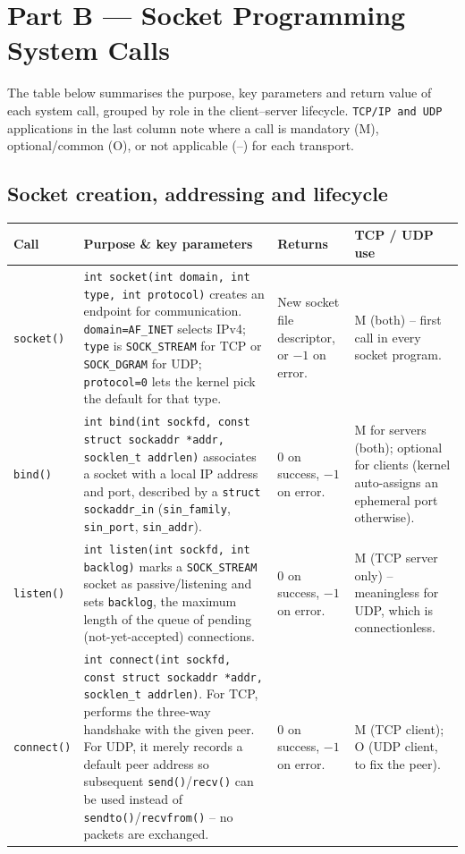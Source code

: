\documentclass[11pt,a4paper]{article}
\begin{document}
\clearpage
\section{Part B --- Socket Programming System Calls}

The table below summarises the purpose, key parameters and return value of each system
call, grouped by role in the client--server lifecycle. \texttt{TCP/IP and UDP} applications
in the last column note where a call is mandatory (M), optional/common (O), or not
applicable (--) for each transport.

\subsection{Socket creation, addressing and lifecycle}

\begin{longtable}{|p{2.6cm}|p{6.6cm}|p{2cm}|p{3.6cm}|}
\hline
\textbf{Call} & \textbf{Purpose \& key parameters} & \textbf{Returns} & \textbf{TCP / UDP use} \\ \hline
\endhead

\texttt{socket()} &
\texttt{int socket(int domain, int type, int protocol)} creates an endpoint for
communication. \texttt{domain=AF\_INET} selects IPv4; \texttt{type} is
\texttt{SOCK\_STREAM} for TCP or \texttt{SOCK\_DGRAM} for UDP; \texttt{protocol=0} lets the
kernel pick the default for that type. &
New socket file descriptor, or $-1$ on error. &
M (both) -- first call in every socket program. \\ \hline

\texttt{bind()} &
\texttt{int bind(int sockfd, const struct sockaddr *addr, socklen\_t addrlen)} associates a
socket with a local IP address and port, described by a \texttt{struct sockaddr\_in}
(\texttt{sin\_family}, \texttt{sin\_port}, \texttt{sin\_addr}). &
$0$ on success, $-1$ on error. &
M for servers (both); optional for clients (kernel auto-assigns an ephemeral port
otherwise). \\ \hline

\texttt{listen()} &
\texttt{int listen(int sockfd, int backlog)} marks a \texttt{SOCK\_STREAM} socket as
passive/listening and sets \texttt{backlog}, the maximum length of the queue of pending
(not-yet-accepted) connections. &
$0$ on success, $-1$ on error. &
M (TCP server only) -- meaningless for UDP, which is connectionless. \\ \hline

\texttt{connect()} &
\texttt{int connect(int sockfd, const struct sockaddr *addr, socklen\_t addrlen)}. For TCP,
performs the three-way handshake with the given peer. For UDP, it merely records a default
peer address so subsequent \texttt{send()}/\texttt{recv()} can be used instead of
\texttt{sendto()}/\texttt{recvfrom()} -- no packets are exchanged. &
$0$ on success, $-1$ on error. &
M (TCP client); O (UDP client, to fix the peer). \\ \hline


\end{longtable}
\end{document}
